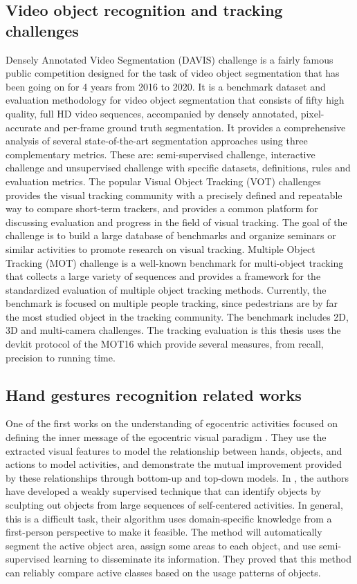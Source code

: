 \subsection{Video object recognition and tracking challenges}
Densely Annotated Video Segmentation (DAVIS) challenge \cite{7780657} is a fairly famous public competition designed for the task of video object segmentation that has been going on for 4 years from 2016 to 2020. It is a benchmark dataset and evaluation methodology for video object segmentation that consists of fifty high quality, full HD video sequences, accompanied by densely annotated, pixel-accurate and per-frame ground truth segmentation. It provides a comprehensive analysis of several state-of-the-art segmentation approaches using three complementary metrics. These are: semi-supervised challenge, interactive challenge and unsupervised challenge with specific datasets, definitions, rules and evaluation metrics.
The popular Visual Object Tracking (VOT) challenges \cite{VOT_TPAMI} provides the visual tracking community with a precisely defined and repeatable way to compare short-term trackers, and provides a common platform for discussing evaluation and progress in the field of visual tracking. The goal of the challenge is to build a large database of benchmarks and organize seminars or similar activities to promote research on visual tracking.
Multiple Object Tracking (MOT) \cite{DBLP:journals/corr/MilanL0RS16} challenge is a well-known benchmark for multi-object tracking that collects a large variety of sequences and provides a framework for the standardized evaluation of multiple object tracking methods. Currently, the benchmark is focused on multiple people tracking, since pedestrians are by far the most studied object in the tracking community. The benchmark includes 2D, 3D and multi-camera challenges. The tracking evaluation is this thesis uses the devkit protocol of the MOT16 which provide several measures, from recall, precision to running time. 
\subsection{Hand gestures recognition related works}
One of the first works on the understanding of egocentric activities focused on defining the inner message of the egocentric visual paradigm \cite{10.1109/ICCV.2011.6126269}. They use the extracted visual features to model the relationship between hands, objects, and actions to model activities, and demonstrate the mutual improvement provided by these relationships through bottom-up and top-down models.
In \cite{5995444}, the authors have developed a weakly supervised technique that can identify objects by sculpting out objects from large sequences of self-centered activities. In general, this is a difficult task, their algorithm uses domain-specific knowledge from a first-person perspective to make it feasible. The method will automatically segment the active object area, assign some areas to each object, and use semi-supervised learning to disseminate its information. They proved that this method can reliably compare active classes based on the usage patterns of objects.

